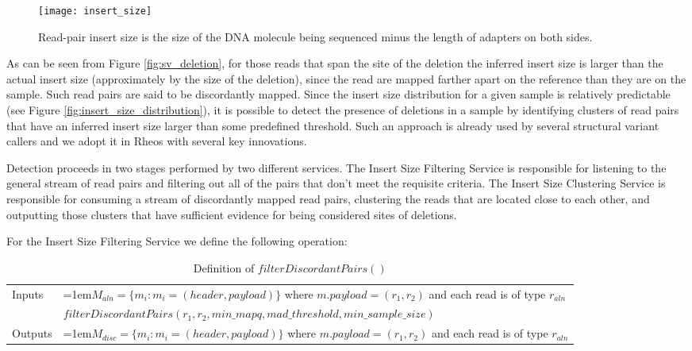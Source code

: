 \begin{figure}[H]
    \texttt{[image: insert\_size]}
    \centering
    \caption {Read-pair insert size is the size of the DNA molecule being sequenced minus the length of adapters on both sides\autocite{turner2014assessment}.}
    \label{fig:insert_size}
\end{figure}

As can be seen from Figure \ref{fig:sv_deletion}, for those reads that span the site of the deletion the inferred insert size is larger than the actual insert size (approximately by the size of the deletion), since the read are mapped farther apart on the reference than they are on the sample. Such read pairs are said to be discordantly mapped. Since the insert size distribution for a given sample is relatively predictable (see Figure \ref{fig:insert_size_distribution}), it is possible to detect the presence of deletions in a sample by identifying clusters of read pairs that have an inferred insert size larger than some predefined threshold. Such an approach is already used by several structural variant callers\autocites{rausch2012delly}{layer2014lumpy} and we adopt it in Rheos with several key innovations.

Detection proceeds in two stages performed by two different services. The Insert Size Filtering Service is responsible for listening to the general stream of read pairs and filtering out all of the pairs that don't meet the requisite criteria. The Insert Size Clustering Service is responsible for consuming a stream of discordantly mapped read pairs, clustering the reads that are located close to each other, and outputting those clusters that have sufficient evidence for being considered sites of deletions.

For the Insert Size Filtering Service we define the following operation:

\bgroup
\def\arraystretch{1.5}
\begin{table}[!ht]
    \caption{Definition of $filterDiscordantPairs()$}
    \label{tab:op_filter_discordant_pairs}
    {\begin{tabular}{l|p{12cm}}
    \toprule
    \multirow{2}{*}{Inputs} & \hangindent=1em$M_{aln} = \{m_i: m_i = (header, payload)\}$ where $m.payload = (r_1,r_2)$ and each read is of type $r_{aln}$\\
    \cline{2-2}
    \multirow{2}{*}{Operation} & $filterDiscordantPairs(r_1,r_2, min\_mapq, mad\_threshold, min\_sample\_size)$\\
     \cline{2-2}
    \multirow{2}{*}{Outputs} & \hangindent=1em$M_{disc} = \{m_i: m_i = (header, payload)\}$ where $m.payload = (r_1,r_2)$ and each read is of type $r_{aln}$\\
    \bottomrule
    \end{tabular}}
\end{table}
\egroup

